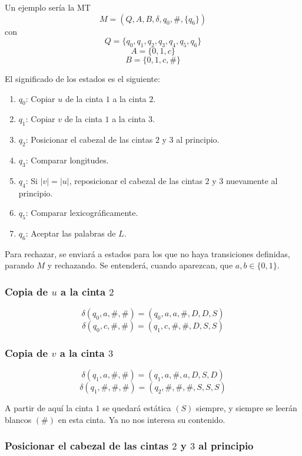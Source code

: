 \documentclass[12pt]{article}
\begin{document}
\begin{ejercicio}
        Un ejemplo sería la MT $$M = (Q,A,B, \delta, q_0, \#, \{q_6\})$$
        con 
        $$Q = \{q_0, q_1, q_2, q_3, q_4, q_5, q_6\}$$
        $$A = \{0,1,c\}$$
        $$B = \{0,1,c, \#\}$$

        \newpage

        El significado de los estados es el siguiente:
        \begin{enumerate}
            \item $q_0$: Copiar $u$ de la cinta $1$ a la cinta $2$.
            \item $q_1$: Copiar $v$ de la cinta $1$ a la cinta $3$.
            \item $q_2$: Posicionar el cabezal de las cintas $2$ y $3$ al principio.
            \item $q_3$: Comparar longitudes.
            \item $q_4$: Si $|v| = |u|$, reposicionar el cabezal de las cintas $2$ y $3$ nuevamente al principio.
            \item $q_5$: Comparar lexicográficamente.
            \item $q_6$: Aceptar las palabras de $L$.
        \end{enumerate}

        Para rechazar, se enviará a estados para los que no haya transiciones definidas,
        parando $M$ y rechazando. Se entenderá, cuando aparezcan, que $a,b \in \{0,1\}$.

        \subsubsection*{Copia de $u$ a la cinta $2$}
        
        $$\delta(q_0, a, \#, \#) = (q_0, a, a, \#, D, D, S)$$
        $$\delta(q_0, c, \#, \#) = (q_1, c, \#, \#, D, S, S)$$

        \subsubsection*{Copia de $v$ a la cinta $3$}
        
        $$\delta(q_1, a, \#, \#) = (q_1, a, \#, a, D, S, D)$$
        $$\delta(q_1, \#, \#, \#) = (q_2, \#, \#, \#, S, S, S)$$
        
        A partir de aquí la cinta $1$ se quedará estática $(S)$ siempre, y siempre se leerán blancos $(\#)$ en esta cinta. Ya no nos interesa
        su contenido.

        \subsubsection*{Posicionar el cabezal de las cintas $2$ y $3$ al principio}


\end{ejercicio}
\end{document}
